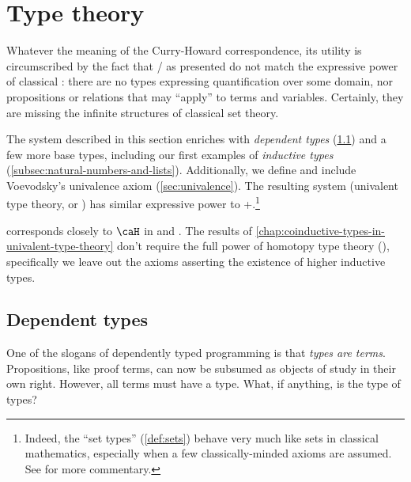 \documentclass[12pt,twoside]{reedthesis}
\begin{document}
\chapter{Type theory}
\label{chap:type-theory}

Whatever the meaning of the Curry-Howard correspondence, its utility is
circumscribed by the fact that \IPL{}/\TLC{} as
presented do not match the expressive power of classical \FOL:
there are no types expressing quantification over some domain, nor propositions
or relations that may ``apply'' to terms and variables. Certainly, they are
missing the infinite structures of classical set theory.

The system described in this section enriches \TLC{} with
\textit{dependent types} (\cref{sec:dependent-types}) and a few more base types,
including our first examples of \textit{inductive types}
(\cref{subsec:natural-numbers-and-lists}). Additionally, we define and include
Voevodsky's univalence axiom (\cref{sec:univalence}). The
resulting system (univalent type theory, or \UTT{}) has similar
expressive power to \ZFC+\FOL.\footnote{Indeed, the
  ``set types'' (\cref{def:sets}) behave very much like sets in classical
  mathematics, especially when a few classically-minded axioms are assumed. See
  \cite{book} for more commentary.}

\UTT{} corresponds closely to $\caH$ in
\cite{inductive} and \cite{homotopy-initial}. The results of
\cref{chap:coinductive-types-in-univalent-type-theory} don't require the full
power of homotopy type theory (\HoTT), specifically we leave out
the axioms asserting the existence of higher inductive types.

\section{Dependent types}
\label{sec:dependent-types}

One of the slogans of dependently typed programming is that \textit{types are
terms}. Propositions, like proof terms, can now be subsumed as objects of study
in their own right. However, all terms must have a type. What, if anything, is
the type of types?
\end{document}
